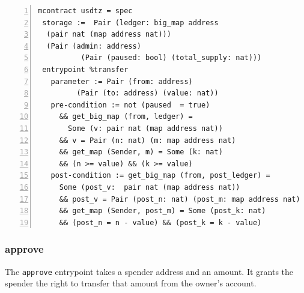 \documentclass[a4paper,USenglish,cleveref, autoref,anonymous]{lipics-v2021}
\begin{document}
\begin{lstlisting}[float,captionpos=b,caption={Specification of the \lstinline/transfer/ entrypoint},label={lst:specification-transfer},numbers=left]
mcontract usdtz = spec 
 storage :=  Pair (ledger: big_map address 
  (pair nat (map address nat))) 
  (Pair (admin: address) 
          (Pair (paused: bool) (total_supply: nat)))
 entrypoint %transfer
   parameter := Pair (from: address)
         (Pair (to: address) (value: nat))
   pre-condition := not (paused  = true)
     && get_big_map (from, ledger) = 
       Some (v: pair nat (map address nat))
     && v = Pair (n: nat) (m: map address nat)
     && get_map (Sender, m) = Some (k: nat) 
     && (n >= value) && (k >= value)
   post-condition := get_big_map (from, post_ledger) = 
     Some (post_v:  pair nat (map address nat))
     && post_v = Pair (post_n: nat) (post_m: map address nat) 
     && get_map (Sender, post_m) = Some (post_k: nat) 
     && (post_n = n - value) && (post_k = k - value)
\end{lstlisting}

\subsubsection{approve}
\label{sec:approve}

The \texttt{approve} entrypoint takes a spender address and an
amount. It grants the spender the right to transfer that amount from
the owner's account.
\end{document}
